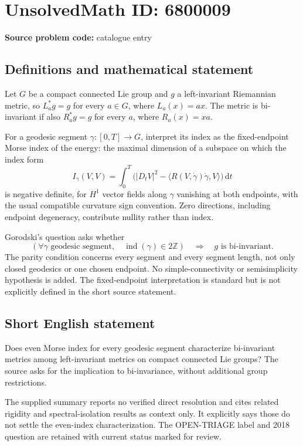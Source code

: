 \documentclass[11pt]{article}
\newcommand{\Z}{\mathbb{Z}}
\begin{document}
\section*{UnsolvedMath ID: 6800009}
\textbf{Source problem code:} catalogue entry
\subsection{Definitions and mathematical statement}
Let $G$ be a compact connected Lie group and $g$ a left-invariant Riemannian metric, so $L_a^*g=g$ for every $a\in G$, where $L_a(x)=ax$. The metric is bi-invariant if also $R_a^*g=g$ for every $a$, where $R_a(x)=xa$.

For a geodesic segment $\gamma:[0,T]\to G$, interpret its index as the fixed-endpoint Morse index of the energy: the maximal dimension of a subspace on which the index form
\[
 I_\gamma(V,V)=\int_0^T\bigl(
 |D_tV|^2-\langle R(V,\dot\gamma)\dot\gamma,V\rangle
 \bigr)\,\mathrm dt
\]
is negative definite, for $H^1$ vector fields along $\gamma$ vanishing at both endpoints, with the usual compatible curvature sign convention. Zero directions, including endpoint degeneracy, contribute nullity rather than index.

Gorodski's question asks whether
\[
 \left(\forall\gamma\text{ geodesic segment},\quad
        \operatorname{ind}(\gamma)\in2\Z\right)
 \quad\Longrightarrow\quad
 g\text{ is bi-invariant}.
\]
The parity condition concerns every segment and every segment length, not only closed geodesics or one chosen endpoint. No simple-connectivity or semisimplicity hypothesis is added. The fixed-endpoint interpretation is standard but is not explicitly defined in the short source statement.
\subsection{Short English statement}
Does even Morse index for every geodesic segment characterize bi-invariant metrics among left-invariant metrics on compact connected Lie groups? The source asks for the implication to bi-invariance, without additional group restrictions.

The supplied summary reports no verified direct resolution and cites related rigidity and spectral-isolation results as context only. It explicitly says those do not settle the even-index characterization. The OPEN-TRIAGE label and 2018 question are retained with current status marked for review.
\end{document}
